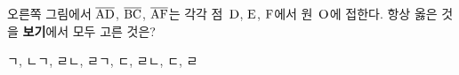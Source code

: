 \noindent\begin{minipage}[t]{0.58\linewidth}\vspace{0pt}\raggedright 오른쪽 그림에서 $\overline{\mathrm{AD}}$, $\overline{\mathrm{BC}}$, $\overline{\mathrm{AF}}$는 각각 점~$\mathrm{D}$, $\mathrm{E}$, $\mathrm{F}$에서 원~$\mathrm{O}$에 접한다. 항상 옳은 것을 \textbf{보기}에서 모두 고른 것은? \end{minipage}\hfill\begin{minipage}[t]{0.4\linewidth}\vspace{0pt}\centering \resizebox{\ifdim\width>\linewidth\linewidth\else\width\fi}{!}{}\end{minipage}\par
\noindent {}
\begin{choices32}{ㄱ, ㄴ}{ㄱ, ㄹ}{ㄴ, ㄹ}{ㄱ, ㄷ, ㄹ}{ㄴ, ㄷ, ㄹ}\end{choices32}

